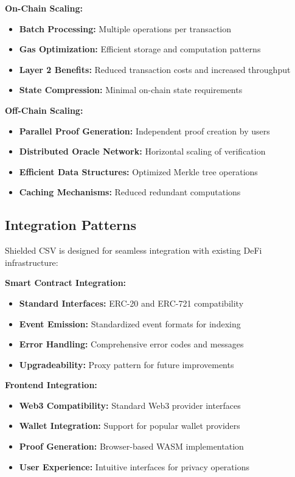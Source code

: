 \documentclass[11pt,a4paper]{article}
\begin{document}
\textbf{On-Chain Scaling:}
\begin{itemize}
    \item \textbf{Batch Processing:} Multiple operations per transaction
    \item \textbf{Gas Optimization:} Efficient storage and computation patterns
    \item \textbf{Layer 2 Benefits:} Reduced transaction costs and increased throughput
    \item \textbf{State Compression:} Minimal on-chain state requirements
\end{itemize}

\textbf{Off-Chain Scaling:}
\begin{itemize}
    \item \textbf{Parallel Proof Generation:} Independent proof creation by users
    \item \textbf{Distributed Oracle Network:} Horizontal scaling of verification
    \item \textbf{Efficient Data Structures:} Optimized Merkle tree operations
    \item \textbf{Caching Mechanisms:} Reduced redundant computations
\end{itemize}

\subsection{Integration Patterns}

Shielded CSV is designed for seamless integration with existing DeFi infrastructure:

\textbf{Smart Contract Integration:}
\begin{itemize}
    \item \textbf{Standard Interfaces:} ERC-20 and ERC-721 compatibility
    \item \textbf{Event Emission:} Standardized event formats for indexing
    \item \textbf{Error Handling:} Comprehensive error codes and messages
    \item \textbf{Upgradeability:} Proxy pattern for future improvements
\end{itemize}

\textbf{Frontend Integration:}
\begin{itemize}
    \item \textbf{Web3 Compatibility:} Standard Web3 provider interfaces
    \item \textbf{Wallet Integration:} Support for popular wallet providers
    \item \textbf{Proof Generation:} Browser-based WASM implementation
    \item \textbf{User Experience:} Intuitive interfaces for privacy operations
\end{itemize}
\end{document}
